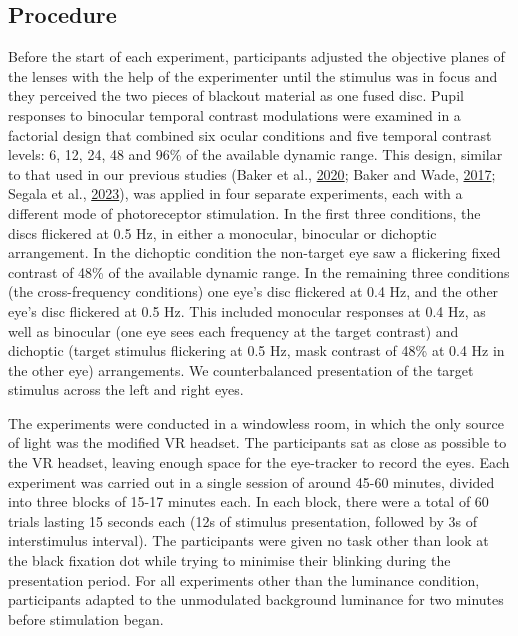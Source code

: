 \documentclass[
]{article}
\begin{document}
\hypertarget{procedure}{%
\subsection{Procedure}\label{procedure}}

Before the start of each experiment, participants adjusted the objective planes of the lenses with the help of the experimenter until the stimulus was in focus and they perceived the two pieces of blackout material as one fused disc. Pupil responses to binocular temporal contrast modulations were examined in a factorial design that combined six ocular conditions and five temporal contrast levels: 6, 12, 24, 48 and 96\% of the available dynamic range. This design, similar to that used in our previous studies (Baker et al., \protect\hyperlink{ref-Baker2020}{2020}; Baker and Wade, \protect\hyperlink{ref-Baker2017}{2017}; Segala et al., \protect\hyperlink{ref-Segala2023}{2023}), was applied in four separate experiments, each with a different mode of photoreceptor stimulation. In the first three conditions, the discs flickered at 0.5 Hz, in either a monocular, binocular or dichoptic arrangement. In the dichoptic condition the non-target eye saw a flickering fixed contrast of 48\% of the available dynamic range. In the remaining three conditions (the cross-frequency conditions) one eye's disc flickered at 0.4 Hz, and the other eye's disc flickered at 0.5 Hz. This included monocular responses at 0.4 Hz, as well as binocular (one eye sees each frequency at the target contrast) and dichoptic (target stimulus flickering at 0.5 Hz, mask contrast of 48\% at 0.4 Hz in the other eye) arrangements. We counterbalanced presentation of the target stimulus across the left and right eyes.

The experiments were conducted in a windowless room, in which the only source of light was the modified VR headset. The participants sat as close as possible to the VR headset, leaving enough space for the eye-tracker to record the eyes. Each experiment was carried out in a single session of around 45-60 minutes, divided into three blocks of 15-17 minutes each. In each block, there were a total of 60 trials lasting 15 seconds each (12s of stimulus presentation, followed by 3s of interstimulus interval). The participants were given no task other than look at the black fixation dot while trying to minimise their blinking during the presentation period. For all experiments other than the luminance condition, participants adapted to the unmodulated background luminance for two minutes before stimulation began.
\end{document}
